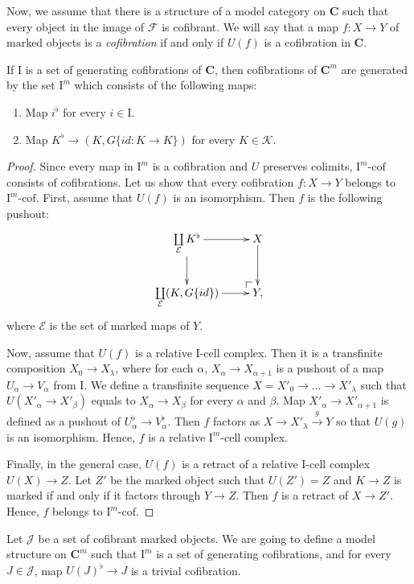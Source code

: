 \documentclass[reqno]{amsart}
\makeatletter
\theoremstyle{definition}
\theoremstyle{remark}
\newcommand{\cat}[1]{\mathbf{#1}}
\newcommand{\C}{\cat{C}}
\newcommand{\I}{\mathrm{I}}
\newcommand{\class}[2]{#1\text{-}\mathrm{#2}}
\newcommand{\Icell}[1][\I]{\class{#1}{cell}}
\newcommand{\Icof}[1][\I]{\class{#1}{cof}}
\numberwithin{figure}{section}
\newcommand{\po}[1][dr]{\save*!/#1+1.2pc/#1:(1,-1)@^{|-}\restore}
\makeatother
\begin{document}
Now, we assume that there is a structure of a model category on $\C$ such that every object in the image of $\mathcal{F}$ is cofibrant.
We will say that a map $f : X \to Y$ of marked objects is a \emph{cofibration} if and only if $U(f)$ is a cofibration in $\C$. 
\begin{prop}
If $\I$ is a set of generating cofibrations of $\C$, then cofibrations of $\C^m$ are generated by the set $\I^m$ which consists of the following maps:
\begin{enumerate}
\item Map $i^\flat$ for every $i \in \I$.
\item Map $K^\flat \to (K, G \{ id : K \to K \})$ for every $K \in \mathcal{K}$.
\end{enumerate}
\end{prop}
\begin{proof}
Since every map in $\I^m$ is a cofibration and $U$ preserves colimits, $\Icof[\I^m]$ consists of cofibrations.
Let us show that every cofibration $f : X \to Y$ belongs to $\Icof[\I^m]$.
First, assume that $U(f)$ is an isomorphism.
Then $f$ is the following pushout:
\[ \xymatrix{ \coprod\limits_\mathcal{E} K^\flat \ar[r] \ar[d] & X \ar[d] \\
              \coprod\limits_\mathcal{E} (K, G \{id\}) \ar[r] & \po Y,
            } \]
where $\mathcal{E}$ is the set of marked maps of $Y$.

Now, assume that $U(f)$ is a relative $\Icell$ complex.
Then it is a transfinite composition $X_0 \to X_\lambda$, where for each $\alpha$, $X_\alpha \to X_{\alpha+1}$ is a pushout of a map $U_\alpha \to V_\alpha$ from $\I$.
We define a transfinite sequence $X = X'_0 \to \ldots \to X'_\lambda$ such that $U(X'_\alpha \to X'_\beta)$ equals to $X_\alpha \to X_\beta$ for every $\alpha$ and $\beta$.
Map $X'_\alpha \to X'_{\alpha+1}$ is defined as a pushout of $U^\flat_\alpha \to V^\flat_\alpha$.
Then $f$ factors as $X \to X'_\lambda \xrightarrow{g} Y$ so that $U(g)$ is an isomorphism.
Hence, $f$ is a relative $\Icell[\I^m]$ complex.

Finally, in the general case, $U(f)$ is a retract of a relative $\Icell$ complex $U(X) \to Z$.
Let $Z'$ be the marked object such that $U(Z') = Z$ and $K \to Z$ is marked if and only if it factors through $Y \to Z$.
Then $f$ is a retract of $X \to Z'$.
Hence, $f$ belongs to $\Icof[\I^m]$.
\end{proof}

Let $\mathcal{J}$ be a set of cofibrant marked objects.
We are going to define a model structure on $\C^m$ such that $\I^m$ is a set of generating cofibrations,
and for every $J \in \mathcal{J}$, map $U(J)^\flat \to J$ is a trivial cofibration.
\end{document}
